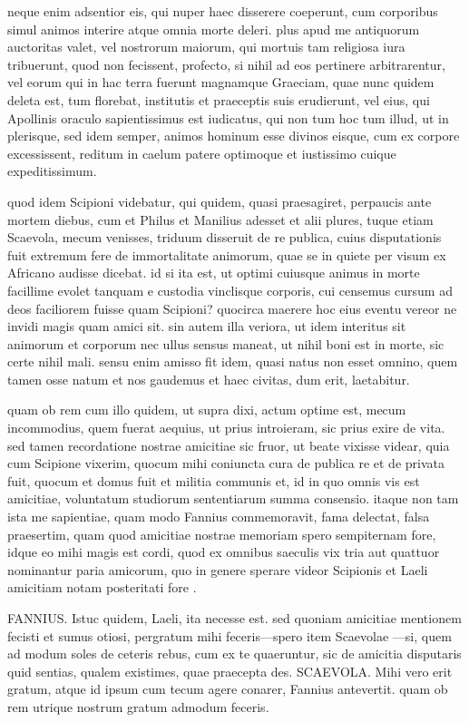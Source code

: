 neque enim adsentior eis, qui nuper haec disserere coeperunt, cum corporibus simul animos interire atque omnia morte deleri. plus apud me antiquorum auctoritas valet, vel nostrorum maiorum, qui mortuis tam religiosa iura tribuerunt, quod non fecissent, profecto, si nihil ad eos pertinere arbitrarentur, vel eorum qui in hac terra fuerunt magnamque Graeciam, quae nunc quidem deleta est, tum florebat, institutis et praeceptis suis erudierunt, vel eius, qui Apollinis oraculo sapientissimus est iudicatus, qui non tum hoc tum illud, ut in plerisque, sed idem semper, animos hominum esse divinos eisque, cum ex corpore excessissent, reditum in caelum patere optimoque et iustissimo cuique expeditissimum.

 quod idem Scipioni videbatur, qui quidem, quasi praesagiret, perpaucis ante mortem diebus, cum et Philus et Manilius adesset et alii plures, tuque etiam Scaevola, mecum venisses, triduum disseruit de re publica, cuius disputationis fuit extremum fere de immortalitate animorum, quae se in quiete per visum ex Africano audisse dicebat. id si ita est, ut optimi cuiusque animus in morte facillime evolet tanquam e custodia vinclisque corporis, cui censemus cursum ad deos faciliorem fuisse quam Scipioni? quocirca maerere hoc eius eventu vereor ne invidi magis quam amici sit. sin autem illa veriora, ut idem interitus sit animorum et corporum nec ullus sensus maneat, ut nihil boni est in morte, sic certe nihil mali. sensu enim amisso fit idem, quasi natus non esset omnino, quem tamen osse natum et nos gaudemus et haec civitas, dum erit, laetabitur.

 quam ob rem cum illo quidem, ut supra dixi, actum optime est, mecum incommodius, quem fuerat aequius, ut prius introieram, sic prius exire de vita. sed tamen recordatione nostrae amicitiae sic fruor, ut beate vixisse videar, quia cum Scipione vixerim, quocum mihi coniuncta cura de publica re et de privata fuit, quocum et domus fuit et militia communis et, id in quo omnis vis est amicitiae, voluntatum studiorum sententiarum summa consensio. itaque non tam ista me sapientiae, quam modo Fannius commemoravit, fama delectat, falsa praesertim, quam quod amicitiae nostrae memoriam spero sempiternam fore, idque eo mihi magis est cordi, quod ex omnibus saeculis vix tria aut quattuor nominantur paria amicorum, quo in genere sperare videor Scipionis et Laeli amicitiam notam posteritati fore .

 FANNIUS. Istuc quidem, Laeli, ita necesse est. sed quoniam amicitiae mentionem fecisti et sumus otiosi, pergratum mihi feceris—spero item Scaevolae —si, quem ad modum soles de ceteris rebus, cum ex te quaeruntur, sic de amicitia disputaris quid sentias, qualem existimes, quae praecepta des. SCAEVOLA. Mihi vero erit gratum, atque id ipsum cum tecum agere conarer, Fannius antevertit. quam ob rem utrique nostrum gratum admodum feceris.

